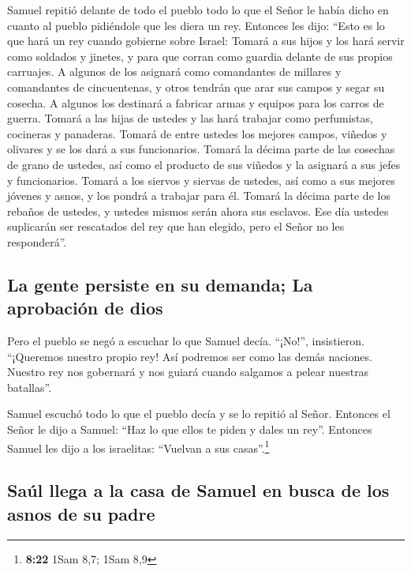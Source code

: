  Samuel repitió delante de todo el pueblo todo lo que el
Señor le había dicho en cuanto al pueblo pidiéndole que les diera un
rey.  Entonces les dijo: ``Esto es lo que hará un rey
cuando gobierne sobre Israel: Tomará a sus hijos y los hará servir como
soldados y jinetes, y para que corran como guardia delante de sus
propios carruajes.  A algunos de los asignará como
comandantes de millares y comandantes de cincuentenas, y otros tendrán
que arar sus campos y segar su cosecha. A algunos los destinará a
fabricar armas y equipos para los carros de guerra. 
Tomará a las hijas de ustedes y las hará trabajar como perfumistas,
cocineras y panaderas.  Tomará de entre ustedes los
mejores campos, viñedos y olivares y se los dará a sus funcionarios.
 Tomará la décima parte de las cosechas de grano de
ustedes, así como el producto de sus viñedos y la asignará a sus jefes y
funcionarios.  Tomará a los siervos y siervas de ustedes,
así como a sus mejores jóvenes y asnos, y los pondrá a trabajar para él.
 Tomará la décima parte de los rebaños de ustedes, y
ustedes mismos serán ahora sus esclavos.  Ese día ustedes
suplicarán ser rescatados del rey que han elegido, pero el Señor no les
responderá''.

\hypertarget{la-gente-persiste-en-su-demanda-la-aprobaciuxf3n-de-dios}{%
\subsection{La gente persiste en su demanda; La aprobación de
dios}\label{la-gente-persiste-en-su-demanda-la-aprobaciuxf3n-de-dios}}

 Pero el pueblo se negó a escuchar lo que Samuel decía.
``¡No!'', insistieron. ``¡Queremos nuestro propio rey! 
Así podremos ser como las demás naciones. Nuestro rey nos gobernará y
nos guiará cuando salgamos a pelear nuestras batallas''.

 Samuel escuchó todo lo que el pueblo decía y se lo
repitió al Señor.  Entonces el Señor le dijo a Samuel:
``Haz lo que ellos te piden y dales un rey''. Entonces Samuel les dijo a
los israelitas: ``Vuelvan a sus casas''.\footnote{\textbf{8:22} 1Sam
  8,7; 1Sam 8,9}

\hypertarget{sauxfal-llega-a-la-casa-de-samuel-en-busca-de-los-asnos-de-su-padre}{%
\subsection{Saúl llega a la casa de Samuel en busca de los asnos de su
padre}\label{sauxfal-llega-a-la-casa-de-samuel-en-busca-de-los-asnos-de-su-padre}}

